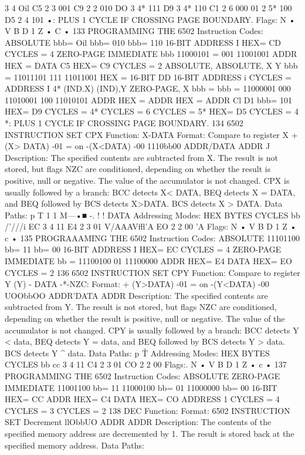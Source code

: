 3
4
Oil
C5
2
3
001
C9
2
2
010
DO
3
4*
111
D9
3
4*
110
C1
2
6
000
01
2
5*
100
D5
2
4
101
•: PLUS 1 CYCLE IF CROSSING PAGE BOUNDARY.
Flags:
N
•
V B D 1 Z
•
C
•
133
PROGRAMMING THE 6502
Instruction Codes:
ABSOLUTE
bbb= Oil
bbb= 010
bbb= 110
16-BIT ADDRESS
I
HEX= CD CYCLES = 4
ZERO-PAGE
IMMEDIATE
bbb
11000101
= 001
11001001
ADDR
HEX =
DATA
C5
HEX= C9 CYCLES = 2
ABSOLUTE,
ABSOLUTE,
X
Y
bbb =
11011101
111
11011001
HEX =
16-BIT
DD
16-BIT
ADDRESS
i
CYCLES =
ADDRESS
I
4*
(IND.X)
(IND),Y
ZERO-PAGE, X
bbb =
bbb =
11000001
000
11010001
100
11010101
ADDR
HEX =
ADDR
HEX =
ADDR
Cl
D1
bbb= 101
HEX= D9 CYCLES = 4*
CYCLES = 6
CYCLES = 5*
HEX= D5 CYCLES = 4
*: PLUS 1 CYCLE IF CROSSING PAGE BOUNDARY.
134
6502 INSTRUCTION SET
CPX
Function:
X-DATA
Format:
Compare to register X
+ (X> DATA)
-01
=
on
-(X<DATA)
-00
1110bb00 ADDR/DATA ADDR
J
Description:
The specified contents are subtracted from X. The result is not
stored, but flags NZC are conditioned, depending on whether the
result is positive, null or negative. The value of the accumulator
is not changed. CPX is usually followed by a branch: BCC detects X<
DATA, BEQ detects X = DATA, and BEQ followed by BCS detects
X>DATA. BCS detects X > DATA.
Data Paths:
p
T
1
1
M—•■
-.
! !
DATA
Addressing Modes:
HEX
BYTES
CYCLES
bb
/'///i
EC
3
4
11
E4
2
3
01
V/AAAVffl'A
EO
2
2
00
'A
Flags:
N
•
V B D 1 Z
•
c
•
135
PROGRAAAMING THE 6502
Instruction Codes:
ABSOLUTE 11101100
bb= 11
bb= 00
16-BIT ADDRESS
I
HEX= EC CYCLES = 4
ZERO-PAGE
IMMEDIATE
bb =
11100100
01
11100000
ADDR
HEX= E4
DATA
HEX= EO CYCLES = 2
136
6502 INSTRUCTION SET
CPY
Function:
Compare to register Y
(Y) - DATA -*-NZC:
Format:
+ (Y>DATA)
-01
=
on
-(Y<DATA)
-00
UOObbOO ADDR'DATA ADDR
Description:
The specified contents are subtracted from Y. The result is not
stored, but flags NZC are conditioned, depending on whether the
result is positive, null or negative. The value of the accumulator
is not changed. CPY is usually followed by a branch: BCC detects
Y < data, BEQ detects Y = data, and BEQ followed by BCS
detects Y > data. BCS detects Y ^ data.
Data Paths:
p
\v
T
Addressing Modes:
HEX
BYTES
CYCLES
bb
cc
3
4
11
C4
2
3
01
CO
2
2
00
Flags:.
N
•
V B D 1 Z
•
c
•
137
PROGRAMMING THE 6502
Instruction Codes:
ABSOLUTE
ZERO-PAGE
IMMEDIATE
11001100
bb= 11
11000100
bb= 01
11000000
bb= 00
16-BIT
HEX= CC
ADDR
HEX= C4
DATA
HEX= CO
ADDRESS
1
CYCLES = 4
CYCLES = 3
CYCLES = 2
138
DEC
Function:
Format:
6502 INSTRUCTION SET
Decrement
llObbUO ADDR ADDR
Description:
The contents of the specified memory address are decremented
by 1. The result is stored back at the specified memory address.
Data Paths:
